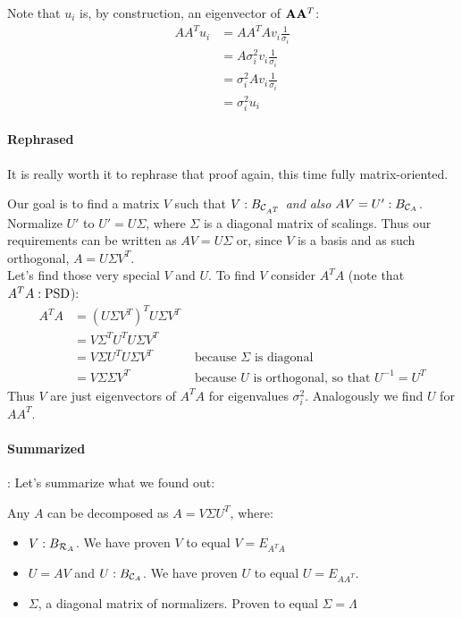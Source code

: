 Note that $u_i$ is, by construction, an eigenvector of $\mathbf{A} \mathbf{A}^T$:
\begin{equation}
    \begin{aligned}
        A A^T u_i   &= A A^T A v_i \frac{1}{\sigma_i} \\
                    &= A \sigma_i^2 v_i \frac{1}{\sigma_i} \\
                    &= \sigma_i^2 A v_i \frac{1}{\sigma_i}\\
                    &= \sigma_i^2 u_i
    \end{aligned}
\end{equation}


\paragraph{Rephrased} It is really worth it to rephrase that proof again, this time fully matrix-oriented. 

Our goal is to find a matrix $V$ such that $V: B_{\mathcal{C}_{A^T}}$ \emph{and also} $AV = U': B_{\mathcal{C}_{A}}$.
Normalize $U'$ to $U' = U \Sigma$, where $\Sigma$ is a diagonal matrix of scalings. 
Thus our requirements can be written as $AV = U\Sigma$ or, since $V$ is a basis and as such orthogonal, $A = U \Sigma V^T$. \\

Let's find those very special $V$ and $U$.
To find $V$ consider $A^T A$ (note that $A^T A: \text{PSD}$):
\begin{equation}
    \begin{aligned}
        A^TA    &= ( U \Sigma V^T )^T U \Sigma V^T & \\
                &= V \Sigma^T U^T U \Sigma V^T & \\
                &= V \Sigma U^T U \Sigma V^T & \text { because $\Sigma$ is diagonal} \\
                &= V \Sigma \Sigma V^T & \text{ because $U$ is orthogonal, so that $U^{-1} = U^T$}
    \end{aligned}
\end{equation}
Thus $V$ are just eigenvectors of $A^T A$ for eigenvalues $\sigma_i^2$.
Analogously we find $U$ for $AA^T$.


\paragraph{Summarized}: Let's summarize what we found out:

Any $A$ can be decomposed as $A = V \Sigma U^T$, where:
\begin{itemize}
    \item $V: B_{\mathcal{R}_{A}}$. We have proven $V$ to equal $V = E_{A^TA}$
    \item $U = AV$ and $U: B_{\mathcal{C}_{A}}$. We have proven $U$ to equal $U = E_{AA^T}$.
    \item $\Sigma$, a diagonal matrix of normalizers. Proven to equal $\Sigma = \Lambda$
\end{itemize}


